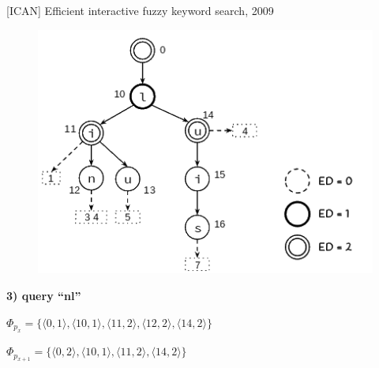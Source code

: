 \documentclass[11pt]{beamer}
\begin{document}
\begin{frame}{[ICAN] Efficient interactive fuzzy keyword search, 2009}

    \begin{figure}
      \includegraphics[scale=0.45]{pictures/ican_4.png}
      \centering
    \end{figure}
    
    \textbf{3) query ``nl''}
    
    $\Phi_{p_{x}} = \big\{ \big \langle 0, 1 \big \rangle, \big \langle 10, 1 \big \rangle, \big \langle 11, 2 \big \rangle, \big \langle 12, 2 \big \rangle, \big \langle 14, 2 \big \rangle \big\}$
    
    $\Phi_{p_{x+1}} = \big\{ \big \langle 0, 2 \big \rangle, \big \langle 10, 1 \big \rangle, \big \langle 11, 2 \big \rangle, \big \langle 14, 2 \big \rangle \big\}$
    
\end{frame}
\end{document}
